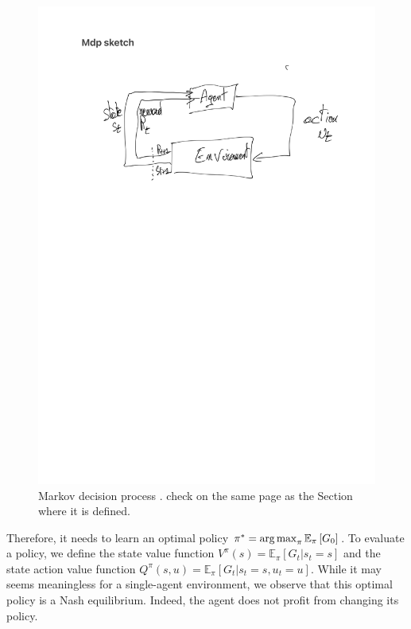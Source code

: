 \begin{figure}
    \centering
    \includegraphics[width=\textwidth]{tex_thesis/figures/ch2/mdp_sketch.pdf}
    \caption{Markov decision process \citep{sutton2018reinforcement}. \todo check on the same page as the Section where it is defined.}
    \label{fig:ch2_mdp}
\end{figure}


Therefore, it needs to learn an optimal policy $\pi^*=\operatorname*{arg\,max}_\pi \mathbb{E}_{\pi}\left[ G_0 \right]$.
To evaluate a policy, we define the state value function $V^\pi(s) = \mathbb{E}_{\pi}\left[G_t|s_t=s\right]$ and the state action value function $Q^\pi(s, u) = \mathbb{E}_{\pi}\left[G_t|s_t=s, u_t=u\right]$.
While it may seems meaningless for a single-agent environment, we observe that this optimal policy is a Nash equilibrium.
Indeed, the agent does not profit from changing its policy.

